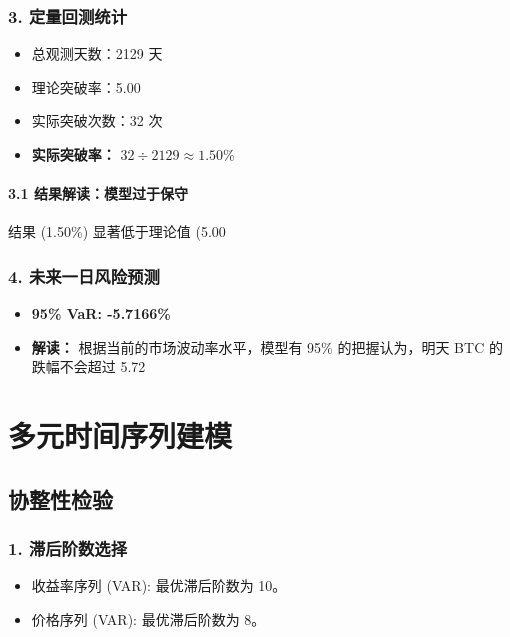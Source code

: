 \documentclass[a4paper]{ctexart}
\begin{document}
	\subsubsection{3. 定量回测统计}
	\begin{itemize}
		\item 总观测天数：2129 天
		\item 理论突破率：5.00%
		\item 实际突破次数：32 次
		\item \textbf{实际突破率：} $32 \div 2129 \approx \mathbf{1.50\%}$
	\end{itemize}
	
	\paragraph{3.1 结果解读：模型过于保守}
	结果 (1.50\%) 显著低于理论值 (5.00%
	
	\subsubsection{4. 未来一日风险预测}
	\begin{itemize}
		\item \textbf{95\% VaR: -5.7166\%}
		\item \textbf{解读：} 根据当前的市场波动率水平，模型有 95\% 的把握认为，明天 BTC 的跌幅不会超过 5.72%
	\end{itemize}
	
	\section{多元时间序列建模}
	\subsection{协整性检验}
	\subsubsection{1. 滞后阶数选择}
	\begin{itemize}
		\item 收益率序列 (VAR): 最优滞后阶数为 10。
		\item 价格序列 (VAR): 最优滞后阶数为 8。
	\end{itemize}
	
\end{document}

